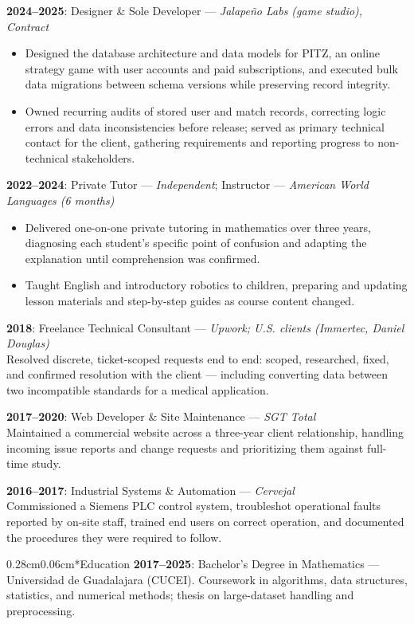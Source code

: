 \documentclass[10.5pt]{article}
\makeatletter
\renewcommand{\section}{\@startsection{section}{1}{0pt}%
  {0.28cm}{0.06cm}{\normalfont\large\bfseries}}
\makeatother
\begin{document}
\textbf{2024--2025}: Designer \& Sole Developer --- \textit{Jalapeño Labs (game studio), Contract}
\begin{itemize}
    \item Designed the database architecture and data models for PITZ, an online strategy game with user accounts and paid subscriptions, and executed bulk data migrations between schema versions while preserving record integrity.
    \item Owned recurring audits of stored user and match records, correcting logic errors and data inconsistencies before release; served as primary technical contact for the client, gathering requirements and reporting progress to non-technical stakeholders.
\end{itemize}

\textbf{2022--2024}: Private Tutor --- \textit{Independent}; Instructor --- \textit{American World Languages (6 months)}
\begin{itemize}
    \item Delivered one-on-one private tutoring in mathematics over three years, diagnosing each student's specific point of confusion and adapting the explanation until comprehension was confirmed.
    \item Taught English and introductory robotics to children, preparing and updating lesson materials and step-by-step guides as course content changed.
\end{itemize}

\textbf{2018}: Freelance Technical Consultant --- \textit{Upwork; U.S. clients (Immertec, Daniel Douglas)} \\
Resolved discrete, ticket-scoped requests end to end: scoped, researched, fixed, and confirmed resolution with the client --- including converting data between two incompatible standards for a medical application.

\textbf{2017--2020}: Web Developer \& Site Maintenance --- \textit{SGT Total} \\
Maintained a commercial website across a three-year client relationship, handling incoming issue reports and change requests and prioritizing them against full-time study.

\textbf{2016--2017}: Industrial Systems \& Automation --- \textit{Cervejal} \\
Commissioned a Siemens PLC control system, troubleshot operational faults reported by on-site staff, trained end users on correct operation, and documented the procedures they were required to follow.

\section*{Education}
\textbf{2017--2025}: Bachelor's Degree in Mathematics --- Universidad de Guadalajara (CUCEI). Coursework in algorithms, data structures, statistics, and numerical methods; thesis on large-dataset handling and preprocessing.
\end{document}
